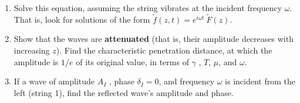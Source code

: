 \documentclass[fleqn]{article}
\begin{document}
\begin{enumerate}
\begin{enumerate}

      \item Solve this equation, assuming the string vibrates at the incident frequency $\omega$. That is, look for solutions of the
      form $\tilde{f}(z,t)=e^{i \omega t} ~ \tilde{F}(z)$.


      \item Show that the waves are \textbf{attenuated} (that is, their amplitude decreases with increasing $z$). Find the characteristic penetration distance, at which the amplitude
      is $1/e$ of its original value, in terms of $\gamma$ , $T$, $\mu$, and $\omega$.


      \item If a wave of amplitude $A_I$ , phase $\delta_I=0$, and frequency $\omega$ is incident from the left (string 1), find the reflected wave’s
      amplitude and phase.


    \end{enumerate}


  \end{enumerate}
\end{document}
